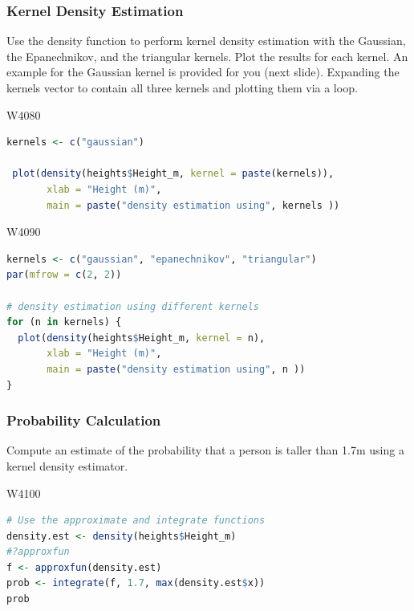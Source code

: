 \subsubsection{Kernel Density Estimation}

\indent 

Use the density function to perform kernel density estimation with the Gaussian, the Epanechnikov, and the triangular kernels. Plot the results for each kernel. An example for the Gaussian kernel is provided for you (next slide). Expanding the kernels vector to contain all three kernels and plotting them via a loop.


\begin{ocg}{}{W408}{0}
\begin{lstlisting}[language = R]
kernels <- c("gaussian")

 plot(density(heights$Height_m, kernel = paste(kernels)), 
       xlab = "Height (m)",
       main = paste("density estimation using", kernels ))
\end{lstlisting}
\end{ocg}


\begin{ocg}{}{W409}{0}
\begin{lstlisting}[language = R]
kernels <- c("gaussian", "epanechnikov", "triangular")
par(mfrow = c(2, 2))

# density estimation using different kernels
for (n in kernels) {
  plot(density(heights$Height_m, kernel = n), 
       xlab = "Height (m)",
       main = paste("density estimation using", n ))
}
\end{lstlisting}
\end{ocg}

\subsubsection{Probability Calculation}

\indent 

Compute an estimate of the probability that a person is taller than 1.7m using a kernel density estimator.


\begin{ocg}{}{W410}{0}
\begin{lstlisting}[language = R]
# Use the approximate and integrate functions
density.est <- density(heights$Height_m)
#?approxfun
f <- approxfun(density.est)
prob <- integrate(f, 1.7, max(density.est$x))
prob
\end{lstlisting}
\end{ocg}


